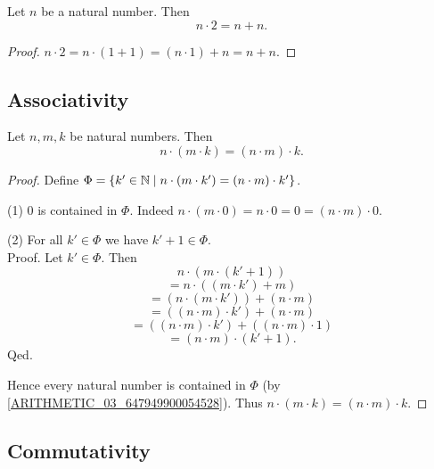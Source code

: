\documentclass[10pt]{article}
\begin{document}
  \begin{forthel}
    \begin{corollary}
      Let $n$ be a natural number.
      Then \[ n \cdot 2 = n + n. \]
    \end{corollary}
    \begin{proof}
      $n \cdot 2
        = n \cdot (1 + 1)
        = (n \cdot 1) + n
        = n + n$.
    \end{proof}
  \end{forthel}


  \subsection{Associativity}

  \begin{forthel}
    \begin{proposition}
      Let $n, m, k$ be natural numbers.
      Then \[ n \cdot (m \cdot k) = (n \cdot m) \cdot k. \]
    \end{proposition}
    \begin{proof}
      Define $\Phi = \{ k' \in \mathbb{N} \mid n \cdot (m \cdot k') =
      (n \cdot m) \cdot k' \}$.

      (1) $0$ is contained in $\Phi$.
      Indeed $n \cdot (m \cdot 0)
        = n \cdot 0
        = 0
        = (n \cdot m) \cdot 0$.

      (2) For all $k' \in \Phi$ we have $k' + 1 \in \Phi$. \\
      Proof.
        Let $k' \in \Phi$.
        Then
        \[  n \cdot (m \cdot (k' + 1))                          \]
        \[    = n \cdot ((m \cdot k') + m)                      \]
        \[    = (n \cdot (m \cdot k')) + (n \cdot m)            \]
        \[    = ((n \cdot m) \cdot k') + (n \cdot m)            \]
        \[    = ((n \cdot m) \cdot k') + ((n \cdot m) \cdot 1)  \]
        \[    = (n \cdot m) \cdot (k' + 1).                     \]
      Qed.

      Hence every natural number is contained in $\Phi$ (by \cref{ARITHMETIC_03_647949900054528}).
      Thus $n \cdot (m \cdot k) = (n \cdot m) \cdot k$.
    \end{proof}
  \end{forthel}


  \subsection{Commutativity}
\end{document}
